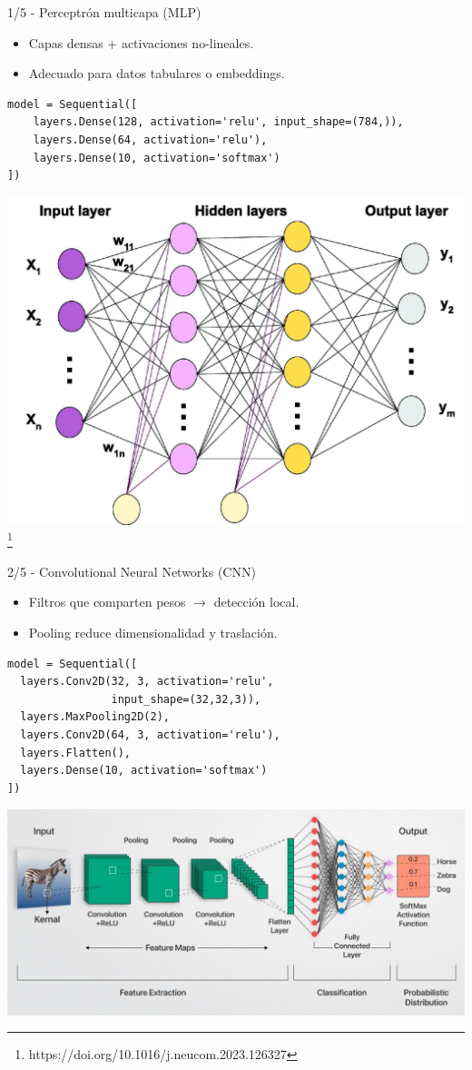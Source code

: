 \documentclass[8pt,spanish]{beamer}
\begin{document}
\begin{frame}[fragile]{1/5  -  Perceptrón multicapa (MLP)}
  \begin{itemize}
    \item Capas densas + activaciones no-lineales.
    \item Adecuado para datos tabulares o embeddings.
  \end{itemize}
  \begin{verbatim}
model = Sequential([
    layers.Dense(128, activation='relu', input_shape=(784,)),
    layers.Dense(64, activation='relu'),
    layers.Dense(10, activation='softmax')
])
  \end{verbatim}
  \centering
  \includegraphics[width=.5\textwidth]{mlp_ex.jpg}\footnote{https://doi.org/10.1016/j.neucom.2023.126327}
\end{frame}

\begin{frame}[fragile]{2/5  -  Convolutional Neural Networks (CNN)}
  \begin{itemize}
    \item Filtros que comparten pesos \(\rightarrow\) detección local.
    \item Pooling reduce dimensionalidad y traslación.
  \end{itemize}
  \begin{verbatim}
model = Sequential([
  layers.Conv2D(32, 3, activation='relu',
                input_shape=(32,32,3)),
  layers.MaxPooling2D(2),
  layers.Conv2D(64, 3, activation='relu'),
  layers.Flatten(),
  layers.Dense(10, activation='softmax')
])
  \end{verbatim}
  \begin{center}
    \includegraphics[width=.7\textwidth]{cnn_ex.png}
  \end{center}
\end{frame}
\end{document}
